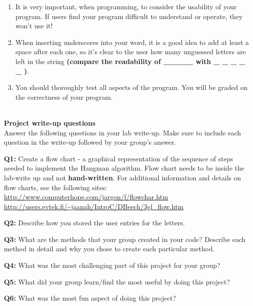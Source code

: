 \documentclass[12pt]{article}
\begin{document}
\begin{enumerate}
	\item It is very important, when programming, to consider the usability of your program. If users find your program difficult to understand or operate, they won't use it! 
	\item When inserting underscores into your word, it is a good idea to add at least a space after each one, so it's clear to the user how many unguessed letters are left in the string \textbf{(compare the readability of \_\_\_\_\_ with \_ \_ \_ \_ \_ )}.
	\item You should thoroughly test all aspects of the program. You will be graded on the correctness of your program.\\
	\\
\end{enumerate}
\vspace*{0.5cm}
\noindent\textbf{Project write-up questions}\\
Answer the following questions in your lab write-up. Make sure to include each question in the write-up followed by your group's answer.

\vspace*{0.5cm}
\noindent\textbf{Q1:} Create a flow chart - a graphical representation of the sequence of steps needed to implement the Hangman algorithm. Flow chart needs to be inside the lab-write up and not \textbf{hand-written}. For additional information and details on flow charts, see the following sites: \\
\url{http://www.computerhope.com/jargon/f/flowchar.htm}\\
\url{http://users.evtek.fi/~jaanah/IntroC/DBeech/3gl_flow.htm} 

\vspace*{0.5cm}
\noindent\textbf{Q2:} Describe how you stored the user entries for the letters.

\vspace*{0.5cm}
\noindent\textbf{Q3:} What are the methods that your group created in your code? Describe each method in detail and why you chose to create each particular method.

\vspace*{0.5cm}
\noindent\textbf{Q4:} What was the most challenging part of this project for your group?

\vspace*{0.5cm}
\noindent\textbf{Q5:} What did your group learn/find the most useful by doing this project?

\vspace*{0.5cm}
\noindent\textbf{Q6:} What was the most fun aspect of doing this project?
	
\end{document}
